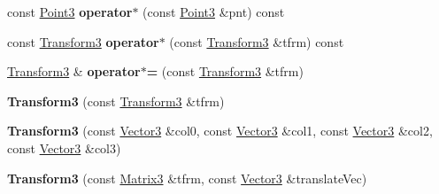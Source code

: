 \begin{DoxyCompactItemize}
\item 
\hypertarget{class_vectormath_1_1_aos_1_1_transform3_a8850e6685195e7d7fc02939b9aaa71c1}{const \hyperlink{class_vectormath_1_1_aos_1_1_point3}{Point3} {\bfseries operator$\ast$} (const \hyperlink{class_vectormath_1_1_aos_1_1_point3}{Point3} \&pnt) const }\label{class_vectormath_1_1_aos_1_1_transform3_a8850e6685195e7d7fc02939b9aaa71c1}

\item 
\hypertarget{class_vectormath_1_1_aos_1_1_transform3_a91bda2053391e6fba6d5f1b6c113e759}{const \hyperlink{class_vectormath_1_1_aos_1_1_transform3}{Transform3} {\bfseries operator$\ast$} (const \hyperlink{class_vectormath_1_1_aos_1_1_transform3}{Transform3} \&tfrm) const }\label{class_vectormath_1_1_aos_1_1_transform3_a91bda2053391e6fba6d5f1b6c113e759}

\item 
\hypertarget{class_vectormath_1_1_aos_1_1_transform3_a568fa73e656eec4ea319c04ace79b9c2}{\hyperlink{class_vectormath_1_1_aos_1_1_transform3}{Transform3} \& {\bfseries operator$\ast$=} (const \hyperlink{class_vectormath_1_1_aos_1_1_transform3}{Transform3} \&tfrm)}\label{class_vectormath_1_1_aos_1_1_transform3_a568fa73e656eec4ea319c04ace79b9c2}

\item 
\hypertarget{class_vectormath_1_1_aos_1_1_transform3_a77ffda55c385ce413eb6f393485cc168}{{\bfseries Transform3} (const \hyperlink{class_vectormath_1_1_aos_1_1_transform3}{Transform3} \&tfrm)}\label{class_vectormath_1_1_aos_1_1_transform3_a77ffda55c385ce413eb6f393485cc168}

\item 
\hypertarget{class_vectormath_1_1_aos_1_1_transform3_a43872d7a822d5384e3ee631d035d91be}{{\bfseries Transform3} (const \hyperlink{class_vectormath_1_1_aos_1_1_vector3}{Vector3} \&col0, const \hyperlink{class_vectormath_1_1_aos_1_1_vector3}{Vector3} \&col1, const \hyperlink{class_vectormath_1_1_aos_1_1_vector3}{Vector3} \&col2, const \hyperlink{class_vectormath_1_1_aos_1_1_vector3}{Vector3} \&col3)}\label{class_vectormath_1_1_aos_1_1_transform3_a43872d7a822d5384e3ee631d035d91be}

\item 
\hypertarget{class_vectormath_1_1_aos_1_1_transform3_a2c98e657db82e24e18c96a8a08f7cf74}{{\bfseries Transform3} (const \hyperlink{class_vectormath_1_1_aos_1_1_matrix3}{Matrix3} \&tfrm, const \hyperlink{class_vectormath_1_1_aos_1_1_vector3}{Vector3} \&translate\+Vec)}\label{class_vectormath_1_1_aos_1_1_transform3_a2c98e657db82e24e18c96a8a08f7cf74}


\end{DoxyCompactItemize}
